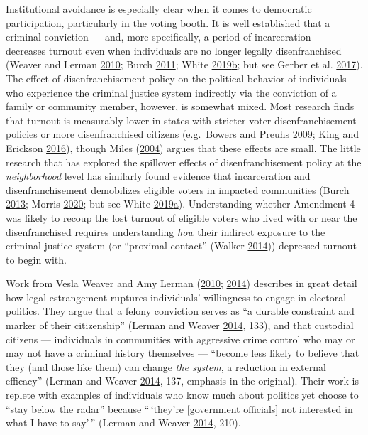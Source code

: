 \documentclass[
  12pt,
]{article}
\begin{document}
Institutional avoidance is especially clear when it comes to democratic participation, particularly in the voting booth. It is well established that a criminal conviction --- and, more specifically, a period of incarceration --- decreases turnout even when individuals are no longer legally disenfranchised (Weaver and Lerman \protect\hyperlink{ref-Weaver2010}{2010}; Burch \protect\hyperlink{ref-Burch2011}{2011}; White \protect\hyperlink{ref-White2019}{2019}\protect\hyperlink{ref-White2019}{b}; but see Gerber et al. \protect\hyperlink{ref-Gerber2017}{2017}). The effect of disenfranchisement policy on the political behavior of individuals who experience the criminal justice system indirectly via the conviction of a family or community member, however, is somewhat mixed. Most research finds that turnout is measurably lower in states with stricter voter disenfranchisement policies or more disenfranchised citizens (e.g.~Bowers and Preuhs \protect\hyperlink{ref-Bowers2009}{2009}; King and Erickson \protect\hyperlink{ref-King2016}{2016}), though Miles (\protect\hyperlink{ref-Miles2004}{2004}) argues that these effects are small. The little research that has explored the spillover effects of disenfranchisement policy at the \emph{neighborhood} level has similarly found evidence that incarceration and disenfranchisement demobilizes eligible voters in impacted communities (Burch \protect\hyperlink{ref-Burch2013}{2013}; Morris \protect\hyperlink{ref-Morris2020}{2020}; but see White \protect\hyperlink{ref-White2019a}{2019}\protect\hyperlink{ref-White2019a}{a}). Understanding whether Amendment 4 was likely to recoup the lost turnout of eligible voters who lived with or near the disenfranchised requires understanding \emph{how} their indirect exposure to the criminal justice system (or ``proximal contact'' (Walker \protect\hyperlink{ref-Walker2014}{2014})) depressed turnout to begin with.

Work from Vesla Weaver and Amy Lerman (\protect\hyperlink{ref-Weaver2010}{2010}; \protect\hyperlink{ref-Lerman2014}{2014}) describes in great detail how legal estrangement ruptures individuals' willingness to engage in electoral politics. They argue that a felony conviction serves as ``a durable constraint and marker of their citizenship'' (Lerman and Weaver \protect\hyperlink{ref-Lerman2014}{2014}, 133), and that custodial citizens --- individuals in communities with aggressive crime control who may or may not have a criminal history themselves --- ``become less likely to believe that they (and those like them) can change \emph{the system}, a reduction in external efficacy'' (Lerman and Weaver \protect\hyperlink{ref-Lerman2014}{2014}, 137, emphasis in the original). Their work is replete with examples of individuals who know much about politics yet choose to ``stay below the radar'' because ``\,`they're {[}government officials{]} not interested in what I have to say'\,'' (Lerman and Weaver \protect\hyperlink{ref-Lerman2014}{2014}, 210).
\end{document}
